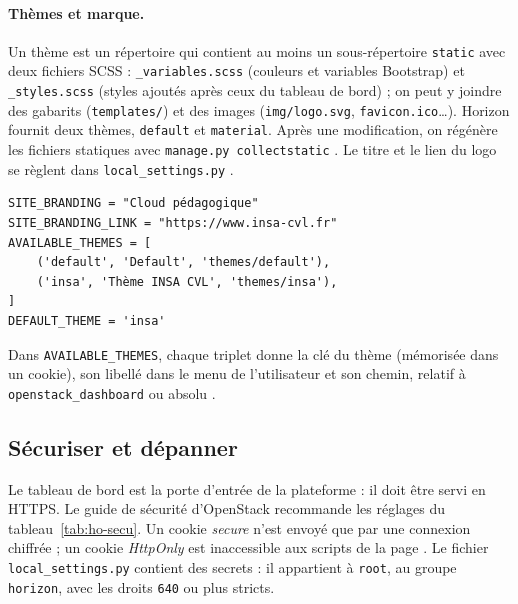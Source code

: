 \paragraph{Thèmes et marque.} Un thème est un répertoire qui contient au moins un sous-répertoire \texttt{static} avec deux
fichiers SCSS : \texttt{\_variables.scss} (couleurs et variables Bootstrap) et \texttt{\_styles.scss} (styles ajoutés après ceux
du tableau de bord) ; on peut y joindre des gabarits (\texttt{templates/}) et des images (\texttt{img/logo.svg},
\texttt{favicon.ico}\dots). Horizon fournit deux thèmes, \texttt{default} et \texttt{material}. Après une modification, on régénère les
fichiers statiques avec \texttt{manage.py collectstatic} \parencite{horizon-themes}. Le titre et le lien du logo se règlent dans
\texttt{local\_\allowbreak settings.py} \parencite{horizon-customizing}.

\par\noindent\begin{minipage}{\linewidth}
\begin{lstlisting}
SITE_BRANDING = "Cloud pédagogique"
SITE_BRANDING_LINK = "https://www.insa-cvl.fr"
AVAILABLE_THEMES = [
    ('default', 'Default', 'themes/default'),
    ('insa', 'Thème INSA CVL', 'themes/insa'),
]
DEFAULT_THEME = 'insa'
\end{lstlisting}
\end{minipage}\par

Dans \texttt{AVAILABLE\_\allowbreak THEMES}, chaque triplet donne la clé du thème (mémorisée dans un cookie), son libellé dans le menu
de l'utilisateur et son chemin, relatif à \texttt{openstack\_\allowbreak dashboard} ou absolu \parencite{horizon-themes}.

\subsection{Sécuriser et dépanner}\label{sec:ho-securite}

Le tableau de bord est la porte d'entrée de la plateforme : il doit être servi en HTTPS. Le guide de sécurité d'OpenStack
recommande les réglages du tableau~\ref{tab:ho-secu}. Un cookie \emph{secure} n'est envoyé que par une connexion chiffrée ;
un cookie \emph{HttpOnly} est inaccessible aux scripts de la page \parencite{security-guide-dashboard}. Le fichier
\texttt{local\_\allowbreak settings.py} contient des secrets : il appartient à \texttt{root}, au groupe \texttt{horizon}, avec les droits
\texttt{640} ou plus stricts.

